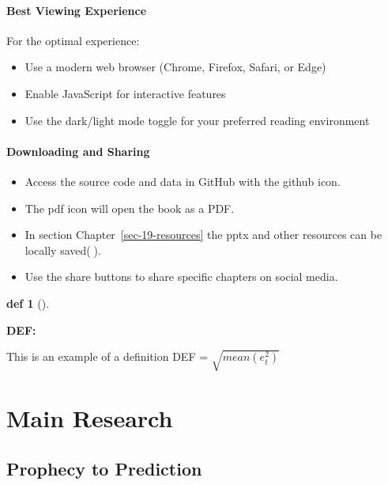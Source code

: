 \documentclass[
  american,
  10,
  a4paper,
]{book}
\providecommand{\tightlist}{%
  \setlength{\itemsep}{0pt}\setlength{\parskip}{0pt}}
\theoremstyle{definition}
\newtheorem{definition}{def}[chapter]
\theoremstyle{remark}
\begin{document}
\subsection{Best Viewing Experience}\label{best-viewing-experience}

For the optimal experience:

\begin{itemize}
\tightlist
\item
  Use a modern web browser (Chrome, Firefox, Safari, or Edge)\\
\item
  Enable JavaScript for interactive features\\
\item
  Use the dark/light mode toggle for your preferred reading environment
\end{itemize}

\subsection{Downloading and Sharing}\label{downloading-and-sharing}

\begin{itemize}
\tightlist
\item
  Access the source code and data in GitHub with the github icon.
\item
  The pdf icon will open the book as a PDF.
\item
  In section Chapter~\ref{sec-19-resources} the pptx and other resources
  can be locally saved(💾).
\item
  Use the share buttons to share specific chapters on social media.
\end{itemize}

\begin{definition}[]\protect\hypertarget{def-EX-DEF}{}\label{def-EX-DEF}

\textbf{DEF:}

This is an example of a definition DEF = \(\sqrt{mean(e^2_t)}\)

\end{definition}

\part{Main Research}

\chapter{Prophecy to Prediction}\label{prophecy-to-prediction}
\end{document}
